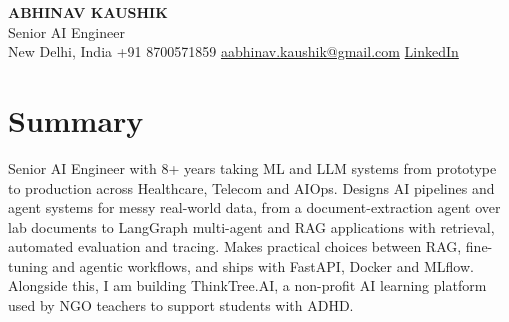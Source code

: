 \documentclass[10pt,a4paper]{article}
\begin{document}
\begin{center}
  {\LARGE\bfseries ABHINAV KAUSHIK}\\[2pt]
  {\large Senior AI Engineer}\\[2pt]
  New Delhi, India \textbar{} +91 8700571859 \textbar{} \href{mailto:aabhinav.kaushik@gmail.com}{aabhinav.kaushik@gmail.com} \textbar{} \href{https://www.linkedin.com/in/abhinav-kaushik10/}{LinkedIn}  
\end{center}

\section{Summary}
Senior AI Engineer with 8+ years taking ML and LLM systems from prototype to production across Healthcare, Telecom and AIOps. Designs AI pipelines and agent systems for messy real-world data, from a document-extraction agent over lab documents to LangGraph multi-agent and RAG applications with retrieval, automated evaluation and tracing. Makes practical choices between RAG, fine-tuning and agentic workflows, and ships with FastAPI, Docker and MLflow. Alongside this, I am building ThinkTree.AI, a non-profit AI learning platform used by NGO teachers to support students with ADHD.
\end{document}

